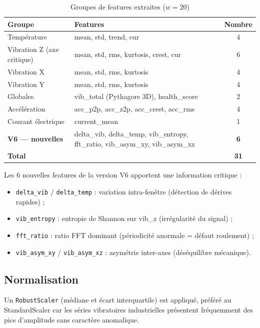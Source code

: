 \documentclass[12pt,a4paper]{report}
\begin{document}
\begin{table}[h]
\centering
\caption{Groupes de features extraites ($w = 20$)}
\begin{tabular}{llc}
\toprule
\textbf{Groupe} & \textbf{Features} & \textbf{Nombre} \\
\midrule
Température          & mean, std, trend, cur & 4 \\
Vibration Z (axe critique) & mean, std, rms, kurtosis, crest, cur & 6 \\
Vibration X          & mean, std, rms, kurtosis & 4 \\
Vibration Y          & mean, std, rms, kurtosis & 4 \\
Globales             & vib\_total (Pythagore 3D), health\_score & 2 \\
Accélération         & acc\_p2p, acc\_z2p, acc\_crest, acc\_rms & 4 \\
Courant électrique   & current\_mean & 1 \\
\textbf{V6 — nouvelles} & delta\_vib, delta\_temp, vib\_entropy, fft\_ratio, vib\_asym\_xy, vib\_asym\_xz & \textbf{6} \\
\midrule
\textbf{Total} & & \textbf{31} \\
\bottomrule
\end{tabular}
\end{table}

Les 6 nouvelles features de la version V6 apportent une information critique :
\begin{itemize}
  \item \texttt{delta\_vib} / \texttt{delta\_temp} : variation intra-fenêtre (détection de dérives rapides) ;
  \item \texttt{vib\_entropy} : entropie de Shannon sur vib\_z (irrégularité du signal) ;
  \item \texttt{fft\_ratio} : ratio FFT dominant (périodicité anormale = défaut roulement) ;
  \item \texttt{vib\_asym\_xy} / \texttt{vib\_asym\_xz} : asymétrie inter-axes (déséquilibre mécanique).
\end{itemize}

\subsection{Normalisation}

Un \texttt{RobustScaler} (médiane et écart interquartile) est appliqué, préféré au StandardScaler car les séries vibratoires industrielles présentent fréquemment des pics d'amplitude sans caractère anomalique.
\end{document}

